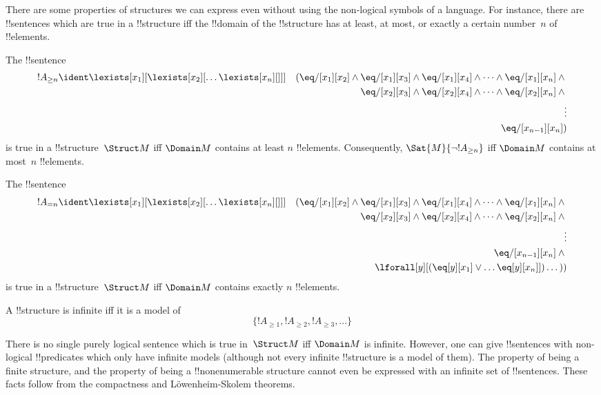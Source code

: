 \documentclass[../../include/open-logic-section]{subfiles}
\begin{document}


\begin{explain}
There are some properties of structures we can express even without
using the non-logical symbols of a language.  For instance, there are
!!{sentence}s which are true in a !!{structure} iff the !!{domain} of
the !!{structure} has at least, at most, or exactly a certain
number~$n$ of !!{element}s.
\end{explain}

\begin{prop}
The !!{sentence}
\begin{align*}
!A_{\ge n} & \ident \lexists[x_1][\lexists[x_2][\dots\lexists[x_n][{}]]] &
  (\eq/[x_1][x_2] \land {} 
  \eq/[x_1][x_3] \land \eq/[x_1][x_4] \land \dots \land \eq/[x_1][x_n] \land {}\\
& & \eq/[x_2][x_3] \land \eq/[x_2][x_4] \land \dots \land {} \eq/[x_2][x_n] \land {} \\
& & \vdots\\
& & \eq/[x_{n-1}][x_n])
\end{align*}
is true in a !!{structure}~$\Struct M$ iff $\Domain M$ contains at
least $n$ !!{element}s. Consequently, $\Sat{M}{\lnot !A_{\ge n}}$ iff
$\Domain M$ contains at most~$n$ !!{element}s.

\end{prop}

\begin{prop}
The !!{sentence}
\begin{align*}
!A_{= n} & \ident \lexists[x_1][\lexists[x_2][\dots\lexists[x_n][{}]]] &
  (\eq/[x_1][x_2] \land {} 
  \eq/[x_1][x_3] \land \eq/[x_1][x_4] \land \dots \land \eq/[x_1][x_n] \land {}\\
& & \eq/[x_2][x_3] \land \eq/[x_2][x_4] \land \dots \land {} \eq/[x_2][x_n] \land {} \\
& & \vdots\\
& & \eq/[x_{n-1}][x_n] \land {} \\
& &\lforall[y][(\eq[y][x_1] \lor \dots \eq[y][x_n]])\dots))
\end{align*}
is true in a !!{structure}~$\Struct M$ iff $\Domain M$ contains
exactly $n$ !!{element}s.
\end{prop}

\begin{prop}
A !!{structure} is infinite iff it is a model of
\[
\{!A_{\ge 1}, !A_{\ge 2}, !A_{\ge 3}, \dots \}
\]
\end{prop}

There is no single purely logical sentence which is true in~$\Struct
M$ iff $\Domain M$ is infinite.  However, one can give !!{sentence}s with
non-logical !!{predicate}s which only have infinite models (although
not every infinite !!{structure} is a model of them).  The property of
being a finite structure, and the property of being a
!!{nonenumerable} structure cannot even be expressed with an infinite
set of !!{sentence}s.  These facts follow from the compactness and
L\"owenheim-Skolem theorems.
\end{document}
